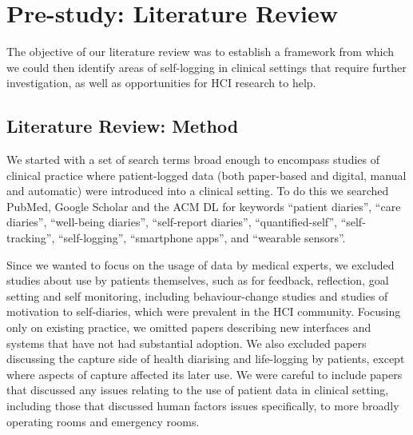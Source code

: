 \documentclass{sigchi}
\begin{document}


\section{Pre-study: Literature Review} 

 The objective of our literature review was to establish a framework from which we could then identify areas of self-logging in clinical settings that require further investigation, as well as opportunities for HCI research to help.  

\subsection{Literature Review: Method}

We started with a set of search terms broad enough to encompass studies of clinical practice where patient-logged data (both paper-based and digital, manual and automatic) were introduced into a clinical setting.  To do this we searched PubMed, Google Scholar and the ACM DL for keywords ``patient diaries'', ``care diaries'', ``well-being diaries'', ``self-report diaries'', ``quantified-self'', ``self-tracking'', ``self-logging'', ``smartphone apps'', and ``wearable sensors''.

Since we wanted to focus on the usage of data by medical experts, we excluded studies about use by patients themselves, such as for feedback, reflection, goal setting and self monitoring, including behaviour-change studies and studies of motivation to self-diaries, which were prevalent in the HCI community.   Focusing only on existing practice, we omitted papers describing new interfaces and systems that have not had substantial adoption.  We also excluded papers discussing the capture side of health diarising and life-logging by patients, except where aspects of capture affected its later use.  We were careful to include papers that discussed any issues relating to the use of patient data in clinical setting, including those that discussed human factors issues specifically, to more broadly operating rooms and emergency rooms.
\end{document}
